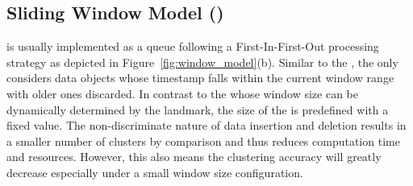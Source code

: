 \subcompact
\subsection{Sliding Window Model (\sliding)}
\label{subsec:sliding}
\sliding is usually implemented as a queue following a First-In-First-Out processing strategy as depicted in Figure~\ref{fig:window_model}(b).
Similar to the \landmark, the \sliding only considers data objects whose timestamp falls within the current window range with older ones discarded. 
In contrast to the \landmark whose window size can be dynamically determined by the landmark, the size of the \sliding is predefined with a fixed value.
The non-discriminate nature of data insertion and deletion results in a smaller number of clusters by comparison and thus reduces computation time and resources. However, this also means the clustering accuracy will greatly decrease especially under a small window size configuration.


\subcompact
